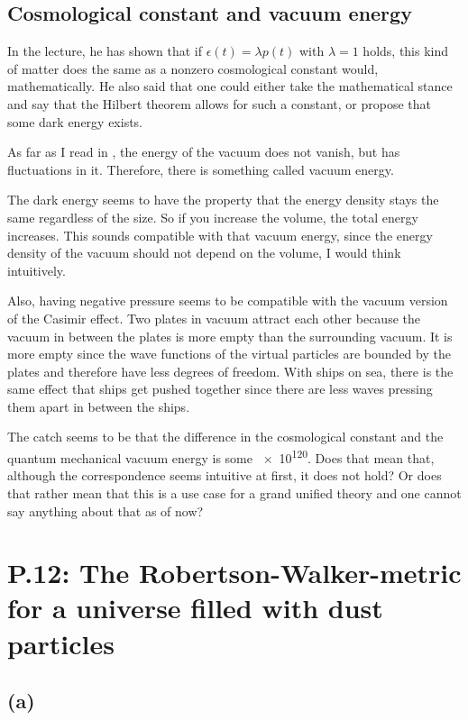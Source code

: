 \subsection*{Cosmological constant and vacuum energy}

In the lecture, he has shown that if $\epsilon(t) = \lambda p(t)$ with $\lambda
= 1$ holds, this kind of matter does the same as a nonzero cosmological
constant would, mathematically. He also said that one could either take the
mathematical stance and say that the Hilbert theorem allows for such a
constant, or propose that some dark energy exists.

As far as I read in \parencite{penrose-road_to_reality}, the energy of the
vacuum does not vanish, but has fluctuations in it. Therefore, there is
something called vacuum energy.

The dark energy seems to have the property that the energy density stays the
same regardless of the size. So if you increase the volume, the total energy
increases. This sounds compatible with that vacuum energy, since the energy
density of the vacuum should not depend on the volume, I would think
intuitively.

Also, having negative pressure seems to be compatible with the vacuum version
of the Casimir effect. Two plates in vacuum attract each other because the
vacuum in between the plates is more empty than the surrounding vacuum. It is
more empty since the wave functions of the virtual particles are bounded by the
plates and therefore have less degrees of freedom. With ships on sea, there is
the same effect that ships get pushed together since there are less waves
pressing them apart in between the ships.

The catch seems to be that the difference in the cosmological constant and the
quantum mechanical vacuum energy is some \num{e120}. Does that mean that,
although the correspondence seems intuitive at first, it does not hold? Or does
that rather mean that this is a use case for a grand unified theory and one
cannot say anything about that as of now?

\vspace*{10cm}

\section*{P.12: The Robertson-Walker-metric for a universe filled with dust
particles}

\subsection*{(a)}

